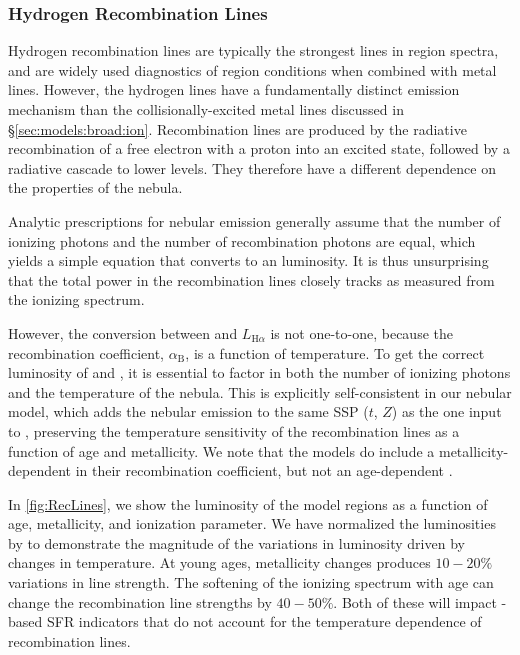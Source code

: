 \subsubsection{Hydrogen Recombination Lines} \label{sec:models:broad:H}

Hydrogen recombination lines are typically the strongest lines in \hii region spectra, and are widely used diagnostics of \hii region conditions when combined with metal lines. However, the hydrogen lines have a fundamentally distinct emission mechanism than the collisionally-excited metal lines discussed in \S\ref{sec:models:broad:ion}. Recombination lines are produced by the radiative recombination of a free electron with a proton into an excited state, followed by a radiative cascade to lower levels. They therefore have a different dependence on the properties of the nebula.

Analytic prescriptions for nebular emission generally assume that the number of ionizing photons and the number of recombination photons are equal, which yields a simple equation that converts \QH{} to an \ha{} luminosity. It is thus unsurprising that the total power in the recombination lines closely tracks \QH{} as measured from the ionizing spectrum.

However, the conversion between \QH{} and $L_{\mathrm{H}\alpha}$ is not one-to-one, because the recombination coefficient, $\alpha_{\mathrm{B}}$, is a function of temperature. To get the correct luminosity of \ha{} and \hb{}, it is essential to factor in both the number of ionizing photons and the temperature of the nebula. This is explicitly self-consistent in our nebular model, which adds the nebular emission to the same SSP ($t$, $Z$) as the one input to \Cloudy, preserving the temperature sensitivity of the recombination lines as a function of age and metallicity. We note that the \Popstar models do include a metallicity-dependent \Te{} in their recombination coefficient, but not an age-dependent \Te{}.

In \ref{fig:RecLines}, we show the \ha{} luminosity of the model \hii regions as a function of age, metallicity, and ionization parameter. We have normalized the \ha{} luminosities by \QH{} to demonstrate the magnitude of the variations in \ha{} luminosity driven by changes in temperature. At young ages, metallicity changes produces $10-20\%$ variations in \ha{} line strength. The softening of the ionizing spectrum with age can change the recombination line strengths by $40-50\%$. Both of these will impact \ha{}-based SFR indicators that do not account for the temperature dependence of recombination lines.

